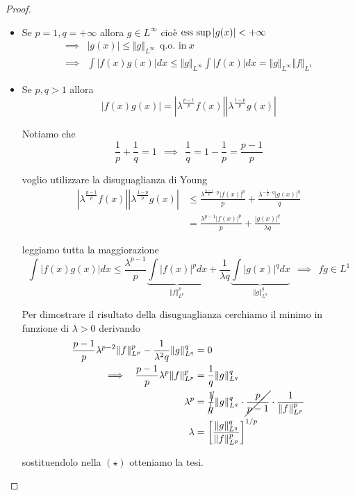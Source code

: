 \begin{proof}\leavevmode
\begin{itemize}
\item Se $p = 1, q = + \infty $ allora $g\in L^{\infty}$ cioè $\operatorname*{ess\ sup}| g(x)| < + \infty $
\begin{align*}
\implies & | g(x)| \leq \Vert g \Vert_{L^{\infty}} \ \ \text{q.o. in} \ x\\
\implies & \int | f(x) g(x)| dx \leq \Vert g \Vert_{L^{\infty}}\int | f(x)| dx = \Vert g \Vert_{L^{\infty}} \Vert f \Vert_{L^{1}}
\end{align*}
\item Se $p, q > 1$ allora
\begin{equation*}
| f(x) g(x)| = \left| \lambda^{\frac{p - 1}{p}} f(x)\right| \left| \lambda^{\frac{1 - p}{p}} g(x)\right|
\end{equation*}

Notiamo che
\begin{equation*}
\frac{1}{p} + \frac{1}{q} = 1\ \ \implies \ \ \frac{1}{q} = 1 - \frac{1}{p} = \frac{p - 1}{p}
\end{equation*}

voglio utilizzare la disuguaglianza di Young
\begin{align*}
\left| \lambda^{\frac{p - 1}{p}} f(x)\right| \left| \lambda^{\frac{1 - p}{p}} g(x)\right| & \leq \frac{\lambda^{\frac{p - 1}{p} \cdot p}| f(x)|^{p}}{p} + \frac{\lambda^{- \frac{1}{q} \cdot q}| g(x)|^{q}}{q}\\
 & = \frac{\lambda^{p - 1}| f(x)|^{p}}{p} + \frac{| g(x)|^{q}}{\lambda q}
\end{align*}

leggiamo tutta la maggiorazione
\begin{equation}
\int | f(x) g(x)| dx \leq \frac{\lambda^{p - 1}}{p}\underbrace{\int | f(x)|^{p} dx}_{\Vert f \Vert^{p}_{L^{p}}} + \frac{1}{\lambda q}\underbrace{\int | g(x)|^{q} dx}_{\Vert g \Vert^{q}_{L^{q}}} \ \ \implies \ \ fg\in L^{1} \tag{*}
\end{equation}

Per dimostrare il risultato della disuguaglianza cerchiamo il minimo in funzione di $\lambda > 0$ derivando
\begin{align*}
\frac{p - 1}{p} \lambda^{p - 2} \Vert f \Vert^{p}_{L^{p}} - \frac{1}{\lambda^{2} q} \Vert g \Vert^{q}_{L^{q}} & = 0\\
\implies \ \ \frac{p - 1}{p} \lambda^{p} \Vert f \Vert^{p}_{L^{p}} & = \frac{1}{q} \Vert g \Vert^{q}_{L^{q}}\\
\lambda^{p} & = \cancel{\frac{1}{q}} \Vert g \Vert^{q}_{L^{q}} \cdot \cancel{\frac{p}{p - 1}} \cdot \frac{1}{\Vert f \Vert^{p}_{L^{p}}}\\
\lambda & = \left[\frac{\Vert g \Vert^{q}_{L^{q}}}{\Vert f \Vert^{p}_{L^{p}}}\right]^{1/p}
\end{align*}

sostituendolo nella $(\star)$ otteniamo la tesi.

\end{itemize}
\end{proof}
